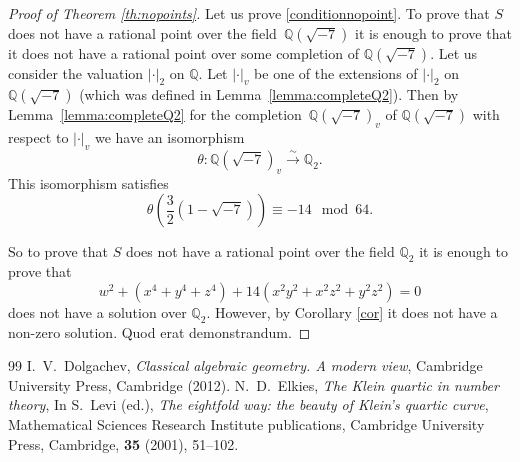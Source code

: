 \documentclass[10pt,a4paper]{amsart}
\begin{document}
\begin{proof}[Proof of Theorem \ref{th:nopoints}]
Let us prove \ref{conditionnopoint}. To prove that $S$ does not have a rational point over the field~$\mathbb{Q}(\sqrt{-7})$ it is enough to prove that  it does not have a rational point over some completion of $\mathbb{Q}(\sqrt{-7}).$ Let us consider the valuation $|\cdot|_2$ on $\mathbb{Q}.$  Let $|\cdot|_v$ be one of the extensions of $|\cdot|_2$ on $\mathbb{Q}(\sqrt{-7})$ (which was defined in Lemma~\ref{lemma:completeQ2}). Then by Lemma~\ref{lemma:completeQ2} for the completion~$\mathbb{Q}(\sqrt{-7})_v$ of $\mathbb{Q}(\sqrt{-7})$ with respect to $|\cdot|_v$ we have an isomorphism
$$
\theta:\mathbb{Q}(\sqrt{-7})_v  \xrightarrow{\sim} \mathbb{Q}_2.
$$ 
This isomorphism satisfies
$$
\theta\left(\frac{3}{2}(1-\sqrt{-7})\right) \equiv -14 \mod 64.
$$ 

\noindent So to prove that  $S$ does not have a rational point over the field $\mathbb{Q}_2$ it is enough to prove that
$$
w^2+(x^4+y^4+z^4)+14(x^2y^2+x^2z^2+y^2z^2)=0
$$
\noindent does not have a solution over $\mathbb{Q}_2.$   However, by Corollary \ref{cor} it does not have a non-zero solution. Quod erat demonstrandum.


\end{proof}

\begin{thebibliography}{99}
 I.~V.~Dolgachev, \emph{Classical algebraic geometry. A modern view}, Cambridge University Press, Cambridge (2012).
 N.~D.~Elkies, \emph{The Klein quartic in number theory}, In S.~Levi (ed.), \emph{The eightfold way: the beauty of Klein's quartic curve},   Mathematical Sciences Research Institute publications, Cambridge University Press, Cambridge, \textbf{35} (2001), 51--102.
\end{thebibliography}
\end{document}
